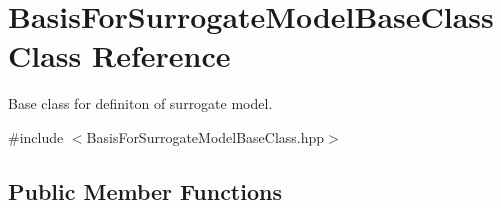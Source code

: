 \hypertarget{class_basis_for_surrogate_model_base_class}{}\section{Basis\+For\+Surrogate\+Model\+Base\+Class Class Reference}
\label{class_basis_for_surrogate_model_base_class}


Base class for definiton of surrogate model.  




{\ttfamily \#include $<$Basis\+For\+Surrogate\+Model\+Base\+Class.\+hpp$>$}

\subsection*{Public Member Functions}
